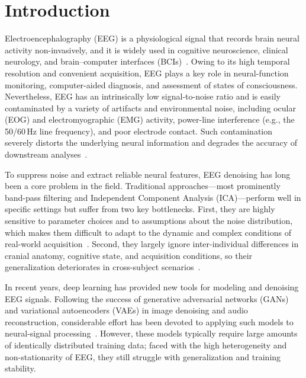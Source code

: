 \section{Introduction}
\label{sec:introduction}

Electroencephalography (EEG) is a physiological signal that records brain neural activity non-invasively, and it is widely used in cognitive neuroscience, clinical neurology, and brain--computer interfaces (BCIs)~\cite{chen2022openworld}. Owing to its high temporal resolution and convenient acquisition, EEG plays a key role in neural-function monitoring, computer-aided diagnosis, and assessment of states of consciousness. 
Nevertheless, EEG has an intrinsically low signal-to-noise ratio and is easily contaminated by a variety of artifacts and environmental noise, including ocular (EOG) and electromyographic (EMG) activity, power-line interference (e.g., the 50/60\,Hz line frequency), and poor electrode contact. Such contamination severely distorts the underlying neural information and degrades the accuracy of downstream analyses~\cite{zhang2021eegdenoisenet,yin2022frequency}.

To suppress noise and extract reliable neural features, EEG denoising has long been a core problem in the field. Traditional approaches---most prominently band-pass filtering and Independent Component Analysis (ICA)---perform well in specific settings but suffer from two key bottlenecks. First, they are highly sensitive to parameter choices and to assumptions about the noise distribution, which makes them difficult to adapt to the dynamic and complex conditions of real-world acquisition~\cite{ghosh2019eyeblink}. Second, they
largely ignore inter-individual differences in cranial anatomy, cognitive state, and acquisition conditions, so their generalization deteriorates in cross-subject scenarios~\cite{jiao2018sparse}.

In recent years, deep learning has provided new tools for modeling and denoising EEG signals. Following the success of generative adversarial networks (GANs) and variational autoencoders (VAEs) in image denoising and audio reconstruction, considerable effort has been devoted to applying such models to neural-signal processing~\cite{yin2023gan}. However, these models typically require large amounts of identically distributed training data; faced with the high heterogeneity and non-stationarity of EEG, they still struggle with generalization and training stability.

